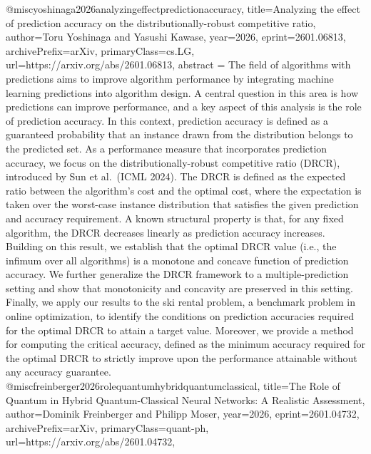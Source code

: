 {}@misc{yoshinaga2026analyzingeffectpredictionaccuracy,
      title={Analyzing the effect of prediction accuracy on the distributionally-robust competitive ratio}, 
      author={Toru Yoshinaga and Yasushi Kawase},
      year={2026},
      eprint={2601.06813},
      archivePrefix={arXiv},
      primaryClass={cs.LG},
      url={https://arxiv.org/abs/2601.06813},
      abstract = {The field of algorithms with predictions aims to improve algorithm performance by integrating machine learning predictions into algorithm design. A central question in this area is how predictions can improve performance, and a key aspect of this analysis is the role of prediction accuracy. In this context, prediction accuracy is defined as a guaranteed probability that an instance drawn from the distribution belongs to the predicted set. As a performance measure that incorporates prediction accuracy, we focus on the distributionally-robust competitive ratio (DRCR), introduced by Sun et al.~(ICML 2024). The DRCR is defined as the expected ratio between the algorithm's cost and the optimal cost, where the expectation is taken over the worst-case instance distribution that satisfies the given prediction and accuracy requirement. A known structural property is that, for any fixed algorithm, the DRCR decreases linearly as prediction accuracy increases. Building on this result, we establish that the optimal DRCR value (i.e., the infimum over all algorithms) is a monotone and concave function of prediction accuracy. We further generalize the DRCR framework to a multiple-prediction setting and show that monotonicity and concavity are preserved in this setting. Finally, we apply our results to the ski rental problem, a benchmark problem in online optimization, to identify the conditions on prediction accuracies required for the optimal DRCR to attain a target value. Moreover, we provide a method for computing the critical accuracy, defined as the minimum accuracy required for the optimal DRCR to strictly improve upon the performance attainable without any accuracy guarantee.}
}@misc{freinberger2026rolequantumhybridquantumclassical,
      title={The Role of Quantum in Hybrid Quantum-Classical Neural Networks: A Realistic Assessment}, 
      author={Dominik Freinberger and Philipp Moser},
      year={2026},
      eprint={2601.04732},
      archivePrefix={arXiv},
      primaryClass={quant-ph},
      url={https://arxiv.org/abs/2601.04732},
}
